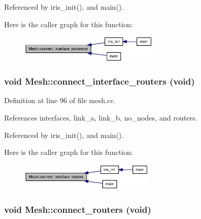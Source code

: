 Referenced by iris\_\-init(), and main().

Here is the caller graph for this function:\nopagebreak
\begin{figure}[H]
\begin{center}
\leavevmode
\includegraphics[width=187pt]{classMesh_9dfad9769d936905f5d8b0e4ffad6743_icgraph}
\end{center}
\end{figure}
\subsubsection[{connect\_\-interface\_\-routers}]{\setlength{\rightskip}{0pt plus 5cm}void Mesh::connect\_\-interface\_\-routers (void)}\label{classMesh_0bee0b7a3c9b621524748a97a3575db7}




Definition at line 96 of file mesh.cc.

References interfaces, link\_\-a, link\_\-b, no\_\-nodes, and routers.

Referenced by iris\_\-init(), and main().

Here is the caller graph for this function:\nopagebreak
\begin{figure}[H]
\begin{center}
\leavevmode
\includegraphics[width=181pt]{classMesh_0bee0b7a3c9b621524748a97a3575db7_icgraph}
\end{center}
\end{figure}
\subsubsection[{connect\_\-routers}]{\setlength{\rightskip}{0pt plus 5cm}void Mesh::connect\_\-routers (void)}\label{classMesh_fea2e233774ea469b02cff87afc336bc}




